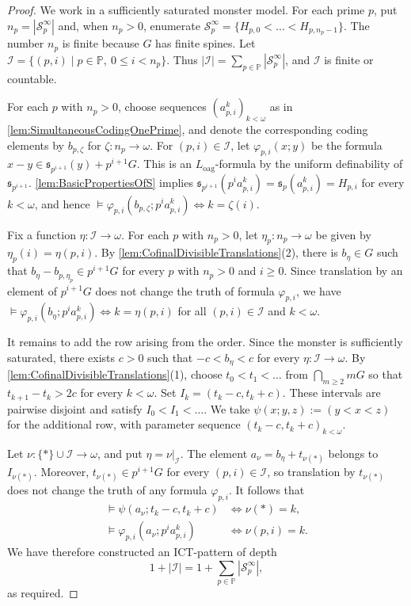 \documentclass{article}
\theoremstyle{definition}
\theoremstyle{remark}
\theoremstyle{plain}
\begin{document}
\begin{proof}
	We work in a sufficiently saturated monster model.
	For each prime $p$, put $n_p=\left|\mathcal{S}_p^\infty\right|$ and, when $n_p>0$, enumerate $\mathcal{S}_p^\infty=\{H_{p,0}<\dots<H_{p,n_p-1}\}$.
	The number $n_p$ is finite because $G$ has finite spines.
	Let $\mathcal{I}=\{(p,i)\mid p\in\mathbb{P},\ 0\leq i<n_p\}$.
	Thus $|\mathcal{I}|=\sum_{p\in\mathbb{P}}\left|\mathcal{S}_p^\infty\right|$, and $\mathcal{I}$ is finite or countable.

	For each $p$ with $n_p>0$, choose sequences $(a_{p,i}^k)_{k<\omega}$ as in \autoref{lem:SimultaneousCodingOnePrime}, and denote the corresponding coding elements by $b_{p,\zeta}$ for $\zeta:n_p\to\omega$.
	For $(p,i)\in\mathcal{I}$, let $\varphi_{p,i}(x;y)$ be the formula $x-y\in\mathfrak{s}_{p^{i+1}}(y)+p^{i+1}G$.
	This is an $L_{\mathrm{oag}}$-formula by the uniform definability of $\mathfrak{s}_{p^{i+1}}$.
	\autoref{lem:BasicPropertiesOfS} implies $\mathfrak{s}_{p^{i+1}}(p^ia_{p,i}^k) = \mathfrak{s}_p(a_{p,i}^k) = H_{p,i}$ for every $k<\omega$, and hence $\models \varphi_{p,i}\left(b_{p,\zeta};p^ia_{p,i}^k\right) \iff k=\zeta(i)$.

	Fix a function $\eta:\mathcal{I}\to\omega$.
	For each $p$ with $n_p>0$, let $\eta_p:n_p\to\omega$ be given by $\eta_p(i)=\eta(p,i)$.
	By \autoref{lem:CofinalDivisibleTranslations}(2), there is $b_\eta\in G$ such that $b_\eta-b_{p,\eta_p}\in p^{i+1}G$ for every $p$ with $n_p>0$ and $i\geq 0$.
	Since translation by an element of $p^{i+1}G$ does not change the truth of formula $\varphi_{p,i}$, we have $\models \varphi_{p,i}\left(b_\eta;p^ia_{p,i}^k\right) \iff k=\eta(p,i)$ for all $(p,i)\in\mathcal{I}$ and $k<\omega$.

	It remains to add the row arising from the order.
	Since the monster is sufficiently saturated, there exists $c>0$ such that $-c<b_\eta<c$ for every $\eta:\mathcal{I}\to\omega$.
	By \autoref{lem:CofinalDivisibleTranslations}(1), choose $t_0<t_1<\dots$ from $\bigcap_{m\geq 2}mG$ so that $t_{k+1}-t_k>2c$ for every $k<\omega$.
	Set $I_k=(t_k-c,t_k+c)$.
	These intervals are pairwise disjoint and satisfy $I_0<I_1<\dots$.
	We take $\psi(x;y,z):=(y<x<z)$ for the additional row, with parameter sequence $(t_k-c,t_k+c)_{k<\omega}$.

	Let $\nu:\{\ast\} \cup \mathcal{I}\to\omega$, and put $\eta=\nu|_{\mathcal{I}}$.
	The element $a_\nu=b_\eta+t_{\nu(\ast)}$ belongs to $I_{\nu(\ast)}$.
	Moreover, $t_{\nu(\ast)}\in p^{i+1}G$ for every $(p,i)\in\mathcal{I}$, so translation by $t_{\nu(\ast)}$ does not change the truth of any formula $\varphi_{p,i}$.
	It follows that
	\begin{align*}
		\models\psi(a_\nu;t_k-c,t_k+c)
		&\iff
		\nu(\ast)=k,\\
		\models
		\varphi_{p,i}
		\left(a_\nu;p^ia_{p,i}^k\right)
		&\iff
		\nu(p,i)=k.
	\end{align*}
	We have therefore constructed an ICT-pattern of depth
	\[
		1+|\mathcal{I}|
		=
		1+\sum_{p\in\mathbb{P}}\left|\mathcal{S}_p^\infty\right|,
	\]
	as required.
\end{proof}
\end{document}
